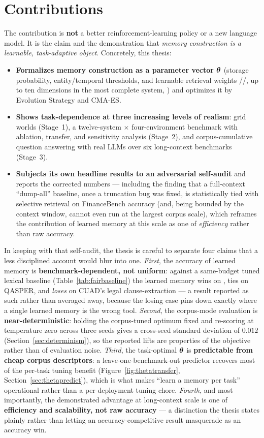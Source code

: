 \section{Contributions}
The contribution is \textbf{not} a better reinforcement-learning policy or a new
language model. It is the claim and the demonstration that \emph{memory
construction is a learnable, task-adaptive object}. Concretely, this thesis:
\begin{itemize}[leftmargin=1.4em]
  \item \textbf{Formalizes memory construction as a parameter vector
  $\boldsymbol{\theta}$} (storage probability, entity/temporal thresholds, and learnable
  retrieval weights \wgraph{}/\wembed{}/\wrec{}, up to ten dimensions in the most
  complete system, \Vfour{}) and optimizes it by Evolution Strategy and CMA-ES.
  \item \textbf{Shows task-dependence at three increasing levels of realism}:
  grid worlds (Stage~1), a twelve-system $\times$ four-environment benchmark with
  ablation, transfer, and sensitivity analysis (Stage~2), and corpus-cumulative
  question answering with real LLMs over six long-context benchmarks (Stage~3).
  \item \textbf{Subjects its own headline results to an adversarial self-audit}
  and reports the corrected numbers --- including the finding that a
  full-context ``dump-all'' baseline, once a truncation bug was fixed, is
  statistically tied with selective retrieval on FinanceBench accuracy (and, being
  bounded by the context window, cannot even run at the largest corpus scale),
  which reframes the contribution of learned memory at this scale as one of
  \emph{efficiency} rather than raw accuracy.
\end{itemize}

In keeping with that self-audit, the thesis is careful to separate four claims
that a less disciplined account would blur into one. \emph{First}, the accuracy
of learned memory is \textbf{benchmark-dependent, not uniform}: against a
same-budget tuned lexical baseline (Table~\ref{tab:fairbaseline}) the learned
\Vt{} memory wins on \FB{}, ties on QASPER, and \emph{loses} on
CUAD's legal clause-extraction --- a result reported as such rather than averaged
away, because the losing case pins down exactly where a single learned memory is
the wrong tool. \emph{Second}, the corpus-mode evaluation is
\textbf{near-deterministic}: holding the corpus-tuned optimum fixed and re-scoring
at temperature zero across three seeds gives a cross-seed standard deviation of
$0.012$ (Section~\ref{sec:determinism}), so the reported lifts are properties of
the objective rather than of evaluation noise. \emph{Third}, the task-optimal $\boldsymbol{\theta}$ is
\textbf{predictable from cheap corpus descriptors}: a leave-one-benchmark-out
predictor recovers most of the per-task tuning benefit
(Figure~\ref{fig:thetatransfer}, Section~\ref{sec:thetapredict}), which is what
makes ``learn a memory per task'' operational rather than a per-deployment tuning
chore. \emph{Fourth}, and most importantly, the demonstrated advantage at
long-context scale is one of \textbf{efficiency and scalability, not raw
accuracy} --- a distinction the thesis states plainly rather than letting an
accuracy-competitive result masquerade as an accuracy win.

